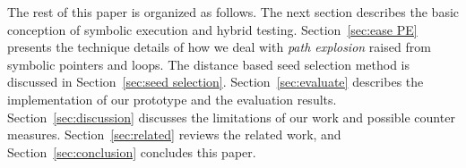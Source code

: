 The rest of this paper is organized as follows. The next section describes the basic conception of symbolic execution and hybrid testing. Section~\ref{sec:ease PE} presents the technique details of how we deal with \textit{path explosion} raised from symbolic pointers and loops. The distance based seed selection method is discussed in Section~\ref{sec:seed selection}. Section~\ref{sec:evaluate} describes the implementation of our prototype and the evaluation results. Section~\ref{sec:discussion} discusses the limitations of our work and possible counter measures. Section~\ref{sec:related} reviews the related work, and Section~\ref{sec:conclusion} concludes this paper.
